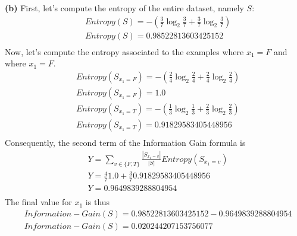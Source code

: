 \documentclass[leqno]{article}
\begin{document}
\noindent \textbf{(b)} First, let's compute the entropy of the entire dataset, namely $S$:
\begin{equation*}
\begin{split}
&Entropy(S) = -(\frac{3}{7}\log_2\frac{3}{7} + \frac{3}{7}\log_2\frac{3}{7}) \\
&Entropy(S) = 0.98522813603425152 \\
\end{split}
\end{equation*}
Now, let's compute the entropy associated to the examples where $x_1 = F$ and where $x_1 = F$.
\begin{equation*}
\begin{split}
&Entropy(S_{x_1 = F}) = -(\frac{2}{4}\log_2\frac{2}{4} + \frac{2}{4}\log_2\frac{2}{4}) \\
&Entropy(S_{x_1 = F}) = 1.0 \\
&Entropy(S_{x_1 = T}) = -(\frac{1}{3}\log_2\frac{1}{3} + \frac{2}{3}\log_2\frac{2}{3}) \\
&Entropy(S_{x_1 = T}) = 0.91829583405448956 \\
\end{split}
\end{equation*} 
Consequently, the second term of the Information Gain formula is
\begin{equation*}
\begin{split}
&Y = \sum_{v \in \{F, T\}}\frac{|S_{x_1 = v}|}{|S|}Entropy(S_{x_1 = v}) \\ 
&Y = \frac{4}{7}1.0 + \frac{3}{7}0.91829583405448956 \\
&Y = 0.9649839288804954 \\
\end{split}
\end{equation*} 
The final value for $x_1$ is thus
\begin{equation*}
\begin{split}
&Information-Gain(S) = 0.98522813603425152 - 0.9649839288804954 \\
&Information-Gain(S) = 0.020244207153756077 \\
\end{split}
\end{equation*} 

\hfill
\end{document}
